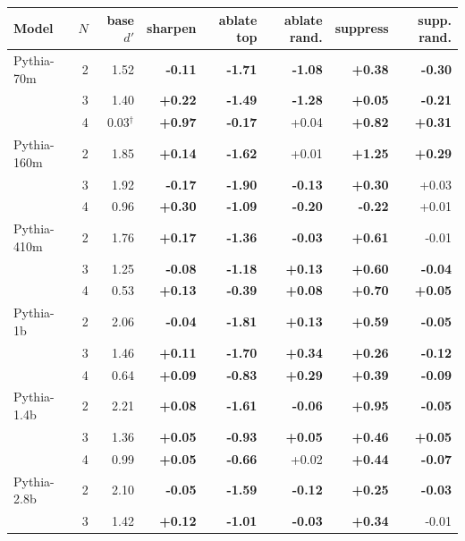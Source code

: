 \begin{tabular}{lrrrrrrr}
\toprule
Model & $N$ & base $d'$ & sharpen & ablate top & ablate rand. & suppress & supp. rand. \\
\midrule
Pythia-70m & 2 & 1.52 & \textbf{-0.11} & \textbf{-1.71} & \textbf{-1.08} & \textbf{+0.38} & \textbf{-0.30} \\
 & 3 & 1.40 & \textbf{+0.22} & \textbf{-1.49} & \textbf{-1.28} & \textbf{+0.05} & \textbf{-0.21} \\
 & 4 & 0.03$^\dagger$ & \textbf{+0.97} & \textbf{-0.17} & +0.04 & \textbf{+0.82} & \textbf{+0.31} \\
\addlinespace[2pt]
Pythia-160m & 2 & 1.85 & \textbf{+0.14} & \textbf{-1.62} & +0.01 & \textbf{+1.25} & \textbf{+0.29} \\
 & 3 & 1.92 & \textbf{-0.17} & \textbf{-1.90} & \textbf{-0.13} & \textbf{+0.30} & +0.03 \\
 & 4 & 0.96 & \textbf{+0.30} & \textbf{-1.09} & \textbf{-0.20} & \textbf{-0.22} & +0.01 \\
\addlinespace[2pt]
Pythia-410m & 2 & 1.76 & \textbf{+0.17} & \textbf{-1.36} & \textbf{-0.03} & \textbf{+0.61} & -0.01 \\
 & 3 & 1.25 & \textbf{-0.08} & \textbf{-1.18} & \textbf{+0.13} & \textbf{+0.60} & \textbf{-0.04} \\
 & 4 & 0.53 & \textbf{+0.13} & \textbf{-0.39} & \textbf{+0.08} & \textbf{+0.70} & \textbf{+0.05} \\
\addlinespace[2pt]
Pythia-1b & 2 & 2.06 & \textbf{-0.04} & \textbf{-1.81} & \textbf{+0.13} & \textbf{+0.59} & \textbf{-0.05} \\
 & 3 & 1.46 & \textbf{+0.11} & \textbf{-1.70} & \textbf{+0.34} & \textbf{+0.26} & \textbf{-0.12} \\
 & 4 & 0.64 & \textbf{+0.09} & \textbf{-0.83} & \textbf{+0.29} & \textbf{+0.39} & \textbf{-0.09} \\
\addlinespace[2pt]
Pythia-1.4b & 2 & 2.21 & \textbf{+0.08} & \textbf{-1.61} & \textbf{-0.06} & \textbf{+0.95} & \textbf{-0.05} \\
 & 3 & 1.36 & \textbf{+0.05} & \textbf{-0.93} & \textbf{+0.05} & \textbf{+0.46} & \textbf{+0.05} \\
 & 4 & 0.99 & \textbf{+0.05} & \textbf{-0.66} & +0.02 & \textbf{+0.44} & \textbf{-0.07} \\
\addlinespace[2pt]
Pythia-2.8b & 2 & 2.10 & \textbf{-0.05} & \textbf{-1.59} & \textbf{-0.12} & \textbf{+0.25} & \textbf{-0.03} \\
 & 3 & 1.42 & \textbf{+0.12} & \textbf{-1.01} & \textbf{-0.03} & \textbf{+0.34} & -0.01 \\

\end{tabular}
